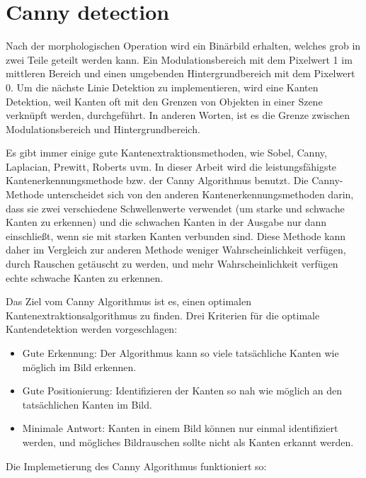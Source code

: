 \section{Canny detection}

Nach der morphologischen Operation wird ein Binärbild erhalten, welches grob in zwei Teile geteilt werden kann. Ein Modulationsbereich mit dem Pixelwert 1 im mittleren Bereich und einen umgebenden Hintergrundbereich mit dem Pixelwert 0. Um die nächste Linie Detektion zu implementieren, wird eine Kanten Detektion, weil Kanten oft mit den Grenzen von Objekten in einer Szene verknüpft werden, durchgeführt. In anderen Worten, ist es die Grenze zwischen Modulationsbereich und Hintergrundbereich. \cite{canny}

Es gibt immer einige gute Kantenextraktionsmethoden, wie Sobel, Canny, Laplacian, Prewitt, Roberts uvm. In dieser Arbeit wird die leistungsfähigste Kantenerkennungsmethode bzw. der Canny Algorithmus benutzt. Die Canny-Methode unterscheidet sich von den anderen Kantenerkennungsmethoden darin, dass sie zwei verschiedene Schwellenwerte verwendet (um starke und schwache Kanten zu erkennen) und die schwachen Kanten in der Ausgabe nur dann einschließt, wenn sie mit starken Kanten verbunden sind. Diese Methode kann daher im Vergleich zur anderen Methode weniger Wahrscheinlichkeit verfügen, durch Rauschen getäuscht zu werden, und mehr Wahrscheinlichkeit verfügen echte schwache Kanten zu erkennen.

Das Ziel vom Canny Algorithmus ist es, einen optimalen Kantenextraktionsalgorithmus zu finden. Drei Kriterien für die optimale Kantendetektion werden vorgeschlagen:

\begin{itemize}

\item Gute Erkennung: Der Algorithmus kann so viele tatsächliche Kanten wie möglich im Bild erkennen.
\item Gute Positionierung: Identifizieren der Kanten so nah wie möglich an den tatsächlichen Kanten im Bild.
\item Minimale Antwort: Kanten in einem Bild können nur einmal identifiziert werden, und mögliches Bildrauschen sollte nicht als Kanten erkannt werden.

\end{itemize}

Die Implemetierung des Canny Algorithmus funktioniert so:

